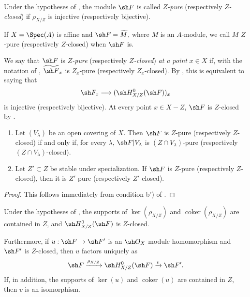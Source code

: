 \begin{definition}[5.9.9]
\label{IV.5.9.9}
Under the hypotheses of , the module $\sh F$ is called
\emph{$Z$-pure} (respectively \emph{$Z$-closed}) if $\rho_{X/Z}$ is
injective (respectively bijective).
\end{definition}

If $X=\Spec(A)$ is affine and $\sh F=\widetilde M$, where $M$ is an
$A$-module, we call $M$ $Z$-pure (respectively $Z$-closed) when
$\sh F$ is.

We say that $\sh F$ is \emph{$Z$-pure} (respectively
\emph{$Z$-closed}) \emph{at a point} $x\in X$ if, with the notation
of , $\widetilde{\sh F}_x$ is $Z_x$-pure
(respectively $Z_x$-closed).  By , this is equivalent
to saying that
\[
 \sh F_x\longrightarrow(\sh H^0_{X/Z}(\sh F))_x
\]
is injective (respectively bijective).  At every point $x\in X-Z$,
$\sh F$ is $Z$-closed by .

\begin{corollary}[5.9.10]
\label{IV.5.9.10}
\begin{enumerate}[{\rm(i)}]
  \item\label{IV.5.9.10.i}
    Let $(V_\lambda)$ be an open covering of $X$.  Then $\sh F$ is
    $Z$-pure (respectively $Z$-closed) if and only if, for every
    $\lambda$, $\sh F|V_\lambda$ is $(Z\cap V_\lambda)$-pure
    (respectively $(Z\cap V_\lambda)$-closed).
  \item\label{IV.5.9.10.ii}
    Let $Z'\subset Z$ be stable under specialization.  If $\sh F$ is
    $Z$-pure (respectively $Z$-closed), then it is $Z'$-pure
    (respectively $Z'$-closed).
\end{enumerate}
\end{corollary}

\begin{proof}
This follows immediately from condition b') of .
\end{proof}

\begin{proposition}[5.9.11]
\label{IV.5.9.11}
Under the hypotheses of , the supports of
$\ker(\rho_{X/Z})$ and $\operatorname{coker}(\rho_{X/Z})$ are
contained in $Z$, and $\sh H^0_{X/Z}(\sh F)$ is $Z$-closed.

Furthermore, if $u:\sh F\to\sh F'$ is an $\sh O_X$-module
homomorphism and $\sh F'$ is $Z$-closed, then $u$ factors uniquely as
\[
 \sh F\xrightarrow{\rho_{X/Z}}\sh H^0_{X/Z}(\sh F)
 \xrightarrow{v}\sh F'.
\]
If, in addition, the supports of $\ker(u)$ and $\operatorname{coker}(u)$
are contained in $Z$, then $v$ is an isomorphism.
\end{proposition}

